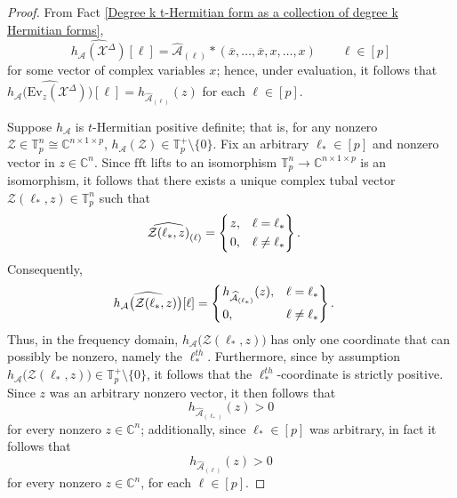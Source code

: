 \documentclass[11pt]{article}
\begin{document}
\begin{proof}
    From Fact \ref{Degree k t-Hermitian form as a collection of degree k Hermitian forms}, 
    \[\widehat{h_{\mathcal{A}}(\mathcal{X}^{\Delta})}[\ell] = \widehat{\mathcal{A}}_{(\ell)}*(\overline{x},\dots,\overline{x},x,\dots,x)\qquad \ell\in [p]\]
    for some vector of complex variables $x$; hence, under evaluation, it follows that $\widehat{h_{\mathcal{A}}\big(\mathrm{Ev}_z(\mathcal{X}^{\Delta})\big)}[\ell] = h_{\widehat{\mathcal{A}}_{(\ell)}}(z)$ for each $\ell\in [p]$.

    Suppose $h_{\mathcal{A}}$ is $t$-Hermitian positive definite; that is, for any nonzero $\mathcal{Z}\in \mathbb{T}_p^n\cong \mathbb{C}^{n\times 1\times p}$, $h_{\mathcal{A}}(\mathcal{Z})\in \mathbb{T}_p^+\setminus \{0\}$. Fix an arbitrary $\ell_*\in [p]$ and nonzero vector in $z\in \mathbb{C}^n$. Since $\mathrm{fft}$ lifts to an isomorphism $\mathbb{T}_p^n\rightarrow \mathbb{C}^{n\times 1\times p}$ is an isomorphism, it follows that there exists a unique complex tubal vector $\mathcal{Z}(\ell_*,z)\in \mathbb{T}_p^n$ such that 
    \[\widehat{\mathcal{Z}(\ell_*,z)}_{(\ell)} = 
    \begin{cases}
        \begin{rcases}
            z, & \ell = \ell_* \\
            0, & \ell\neq \ell_*
        \end{rcases}.
    \end{cases}\]
    Consequently, 
    \[\widehat{h_{\mathcal{A}}\big(\mathcal{Z}(\ell_*,z)\big)}[\ell] = 
    \begin{cases}
        \begin{rcases}
            h_{\widehat{\mathcal{A}}_{(\ell_*)}}(z), & \ell = \ell_* \\
            0, & \ell\neq \ell_*
        \end{rcases}.
    \end{cases}\]
    Thus, in the frequency domain, $h_{\mathcal{A}}\big(\mathcal{Z}(\ell_*,z)\big)$ has only one coordinate that can possibly be nonzero, namely the $\ell_*^{th}$. Furthermore, since by assumption $h_{\mathcal{A}}\big(\mathcal{Z}(\ell_*,z)\big)\in \mathbb{T}_p^+\setminus \{0\}$, it follows that the $\ell_*^{th}$-coordinate is strictly positive. Since $z$ was an arbitrary nonzero vector, it then follows that 
    \[h_{\widehat{\mathcal{A}}_{(\ell_*)}}(z) > 0\]
    for every nonzero $z\in \mathbb{C}^n$; additionally, since $\ell_*\in [p]$ was arbitrary, in fact it follows that 
    \[h_{\widehat{\mathcal{A}}_{(\ell)}}(z) > 0\]
    for every nonzero $z\in \mathbb{C}^n$, for each $\ell\in [p]$. 


\end{proof}
\end{document}
